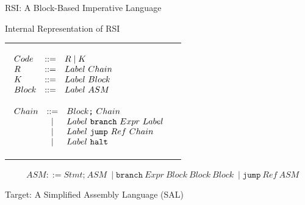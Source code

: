 \documentclass{beamer}
\begin{document}
\begin{frame}{RSI: A Block-Based Imperative Language}

\begin{structure}{Internal Representation of RSI}


\begin{tabular*}{10cm}[]{lc}
{
\begin{minipage}[t]{3.5cm}

\scriptsize{

$
\begin{array}[t]{lcl}

Code &::=& R \mid K\\
R &::=& Label\ Chain\\
K &::=& Label\ Block\\
Block &::=& Label\ ASM\\
\end{array}
$

}  %

\end{minipage}
}

{
\begin{minipage}[t]{1.85in}

\begin{scriptsize}

$
\begin{array}[t]{lcl}

Chain &::=& Block\texttt{;}\ Chain\\
&\mid& Label\ \texttt{branch}\ Expr\ Label\\
&\mid& Label\ \texttt{jump}\ Ref\ Chain\\
&\mid& Label\ \texttt{halt}\\
\end{array}
$
\end{scriptsize}
\end{minipage}
}
\end{tabular*}

\medskip
\scriptsize
{\ \ \ \ \ $ASM ::= Stmt\texttt{;}\ ASM\ \mid \texttt{branch}\ Expr\ Block\ Block\ Block\ \mid \texttt{jump}\ Ref\ ASM$}
\end{structure}

\medskip

\begin{structure}{Target: A Simplified Assembly Language (SAL)}


\end{structure}
\end{frame}
\end{document}
